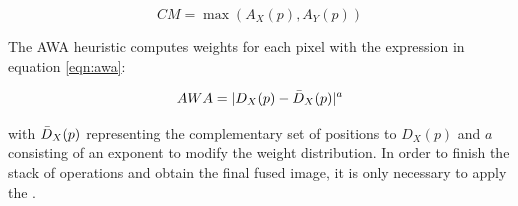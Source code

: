 \begin{equation}
    \label{eqn:cm}
   CM = \max(A_{X}(p),A_{Y}(p))
\end{equation}

\noindent The AWA heuristic computes weights for each pixel with the expression in equation \ref{eqn:awa}:

\begin{equation}
    \label{eqn:awa}
   AWA = |D_{X}(p) - \Bar{D}_{X}(p)|^{a}
\end{equation}

\noindent with $\Bar{D}_{X}(p)$ representing the complementary set of positions to $D_{X}(p)$ and $a$ consisting of an exponent to modify the weight distribution. In order to finish the stack of operations and obtain the final fused image, it is only necessary to apply the .
